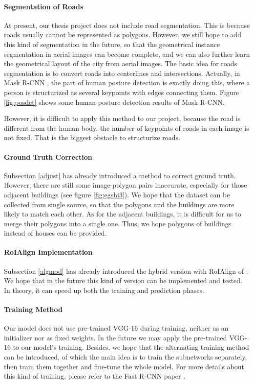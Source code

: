 \paragraph{Segmentation of Roads}
At present, our thesis project does not include road segmentation. This is because roads usually cannot be represented as polygons. However, we still hope to add this kind of segmentation in the future, so that the geometrical instance segmentation in aerial images can become complete, and we can also further learn the geometrical layout of the city from aerial images. The basic idea for roads  segmentation is to convert roads into centerlines and intersections. Actually, in Mask R-CNN \cite{maskrcnn}, the part of human posture detection is exactly doing this, where a person is structurized as several keypoints with edges connecting them. Figure \ref{fig:posdet} shows some human posture detection results of Mask R-CNN.



However, it is difficult to apply this method to our project, because the road is different from the human body, the number of keypoints of roads in each image is not fixed. That is the biggest obstacle to structurize roads.

\paragraph{Ground Truth Correction}
Subsection \ref{adjust} has already introduced a method to correct ground truth. However, there are still some image-polygon pairs inaccurate, especially for those adjacent buildings (see figure \ref{fig:egshi3}). We hope that the dataset can be collected from single source, so that the polygons and the buildings are more likely to match each other. As for the adjacent buildings, it is difficult for us to merge their polygons into a single one. Thus, we hope polygons of buildings instead of houses can be provided.

\paragraph{RoIAlign Implementation}
Subsection \ref{algmod} has already introduced the hybrid version with RoIAlign of \modelnameshort. We hope that in the future this kind of version can be implemented and tested. In theory, it can speed up both the training and prediction phases.

\paragraph{Training Method}
Our model does not use pre-trained VGG-16 during training, neither as an initializer nor as fixed weights. In the future we may apply the pre-trained VGG-16 to our model's training. Besides, we hope that the alternating training method can be introduced, of which the main idea is to train the subnetworks separately, then train them together and fine-tune the whole model. For more details about this kind of training, please refer to the Fast R-CNN paper \cite{fasterrcnn}.

